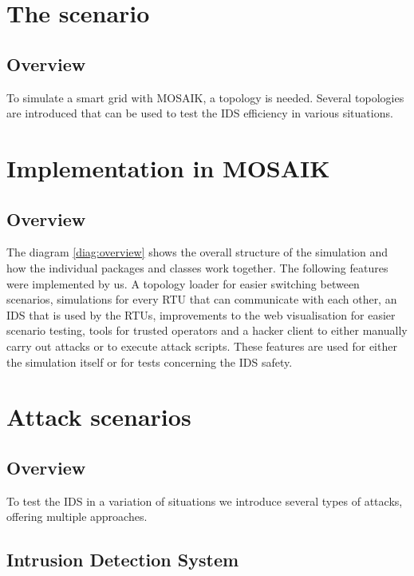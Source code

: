 \section{The scenario}
	
	\subsection{Overview}

		To simulate a smart grid with MOSAIK, a topology is needed. Several topologies are introduced that can be used to test the IDS efficiency in various situations.

\section{Implementation in MOSAIK}

	\subsection{Overview}

		The diagram \ref{diag:overview} shows the overall structure of the simulation and how the individual packages and classes work together.
		The following features were implemented by us. A topology loader for easier switching between scenarios, simulations for every RTU that can communicate with each other, an IDS that is used by the RTUs, improvements to the web visualisation for easier scenario testing, tools for trusted operators and a hacker client to either manually carry out attacks or to execute attack scripts. These features are used for either the simulation itself or for tests concerning the IDS safety.

\section{Attack scenarios}

	\subsection{Overview}

		To test the IDS in a variation of situations we introduce several types of attacks, offering multiple approaches.


\subsection{Intrusion Detection System}
		
